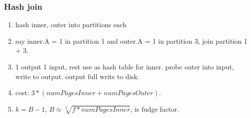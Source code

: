 \documentclass{article}
\begin{document}
\begin{multicols*}{4}
\subsubsection{Hash join}
\begin{enumerate}
  \item hash inner, outer into  partitions each
  \item say inner.A = 1 in partition 1 and outer.A = 1 in partition 3, join partition 1 + 3.
  \item 1 output 1 input, rest use as hash table for inner. probe outer into input, write to output. output full write to disk.
  \item cost: $3 * (numPagesInner + numPagesOuter)$. 
  \item $k = B - 1$, $B \approx \sqrt[2]{f * numPagesInner}$,  is fudge factor.
\end{enumerate}


\end{multicols*}
\end{document}

